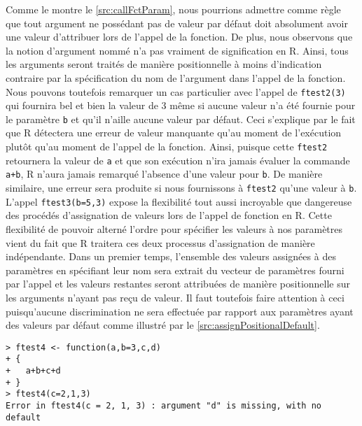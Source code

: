 \vspace{\baselineskip}
Comme le montre le \autoref{src:callFctParam}, nous pourrions admettre comme règle que tout argument ne possédant pas de valeur par défaut doit absolument avoir une valeur d'attribuer lors de l'appel de la fonction. De plus, nous observons que la notion d'argument nommé n'a pas vraiment de signification en R. Ainsi, tous les arguments seront traités de manière positionnelle à moins d'indication contraire par la spécification du nom de l'argument dans l'appel de la fonction. Nous pouvons toutefois remarquer un cas particulier avec l'appel de \texttt{ftest2(3)} qui fournira bel et bien la valeur de 3 même si aucune valeur n'a été fournie pour le paramètre \texttt{b} et qu'il n'aille aucune valeur par défaut. Ceci s'explique par le fait que R détectera une erreur de valeur manquante qu'au moment de l'exécution plutôt qu'au moment de l'appel de la fonction. Ainsi, puisque cette \texttt{ftest2} retournera la valeur de \texttt{a} et que son exécution n'ira jamais évaluer la commande \texttt{a+b}, R n'aura jamais remarqué l'absence d'une valeur pour \texttt{b}. De manière similaire, une erreur sera produite si nous fournissons à \texttt{ftest2} qu'une valeur à \texttt{b}. L'appel \texttt{ftest3(b=5,3)} expose la flexibilité tout aussi incroyable que dangereuse des procédés d'assignation de valeurs lors de l'appel de fonction en R. Cette flexibilité de pouvoir alterné l'ordre pour spécifier les valeurs à nos paramètres vient du fait que R traitera ces deux processus d'assignation de manière indépendante. Dans un premier temps, l'ensemble des valeurs assignées à des paramètres en spécifiant leur nom sera extrait du vecteur de paramètres fourni par l'appel et les valeurs restantes seront attribuées de manière positionnelle sur les arguments n'ayant pas reçu de valeur. Il faut toutefois faire attention à ceci puisqu’aucune discrimination ne sera effectuée par rapport aux paramètres ayant des valeurs par défaut comme illustré par le \autoref{src:assignPositionalDefault}.

\begin{lstlisting}[caption = L'assignation et les valeurs par défaut,label=src:assignPositionalDefault]
> ftest4 <- function(a,b=3,c,d)
+ {
+   a+b+c+d
+ }
> ftest4(c=2,1,3)
Error in ftest4(c = 2, 1, 3) : argument "d" is missing, with no default
\end{lstlisting}

